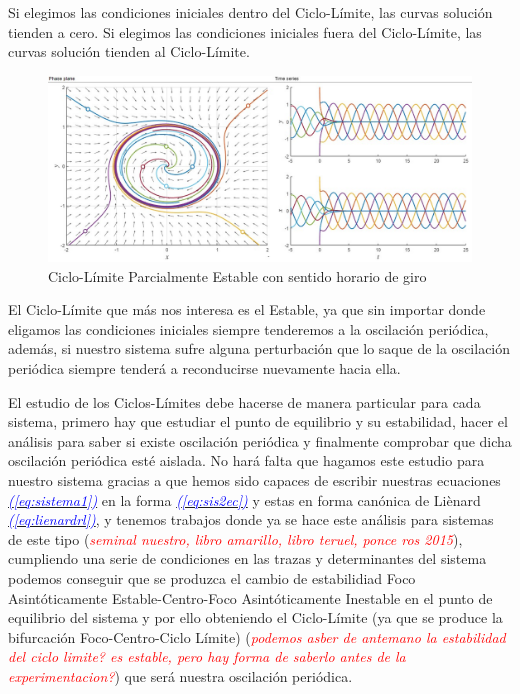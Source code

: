 \documentclass[12pt,a4paper]{report} %
\newcommand{\eref}[1]{\hyperref[#1]{\textcolor{blue}{\textit{(\ref*{#1})}}}}
\begin{document}
	Si elegimos las condiciones iniciales dentro del Ciclo-Límite, las curvas solución tienden a cero. Si elegimos las condiciones iniciales fuera del Ciclo-Límite, las curvas solución tienden al Ciclo-Límite.
	
	\begin{figure}[h]
		\centering
		\includegraphics[width=1\textwidth]{clpe.jpg}
		\caption{Ciclo-Límite Parcialmente Estable con sentido horario de giro}
		\label{fig:clpe}
	\end{figure}\smallskip
	\newpage
	
	El Ciclo-Límite que más nos interesa es el Estable, ya que sin importar donde eligamos las condiciones iniciales siempre tenderemos a la oscilación periódica, además, si nuestro sistema sufre alguna perturbación que lo saque de la oscilación periódica siempre tenderá a reconducirse nuevamente hacia ella.
	
	\vspace{0.5cm}El estudio de los Ciclos-Límites debe hacerse de manera particular para cada sistema, primero hay que estudiar el punto de equilibrio y su estabilidad, hacer el análisis para saber si existe oscilación periódica y finalmente comprobar que dicha oscilación periódica esté aislada. No hará falta que hagamos este estudio para nuestro sistema gracias a que hemos sido capaces de escribir nuestras ecuaciones \eref{eq:sistema1} en la forma \eref{eq:sis2ec} y estas en forma canónica de Liènard \eref{eq:lienardrl}, y tenemos trabajos donde ya se hace este análisis para sistemas de este tipo (\textit{\textcolor{red}{seminal nuestro, libro amarillo, libro teruel, ponce ros 2015}}), cumpliendo una serie de condiciones en las trazas y determinantes del sistema podemos conseguir que se produzca el cambio de estabilidiad Foco Asintóticamente Estable-Centro-Foco Asintóticamente Inestable en el punto de equilibrio del sistema y por ello obteniendo el Ciclo-Límite (ya que se produce la bifurcación Foco-Centro-Ciclo Límite) (\textit{\textcolor{red}{podemos asber de antemano la estabilidad del ciclo limite? es estable, pero hay forma de saberlo antes de la experimentacion?}}) que será nuestra oscilación periódica.
		
\end{document}
